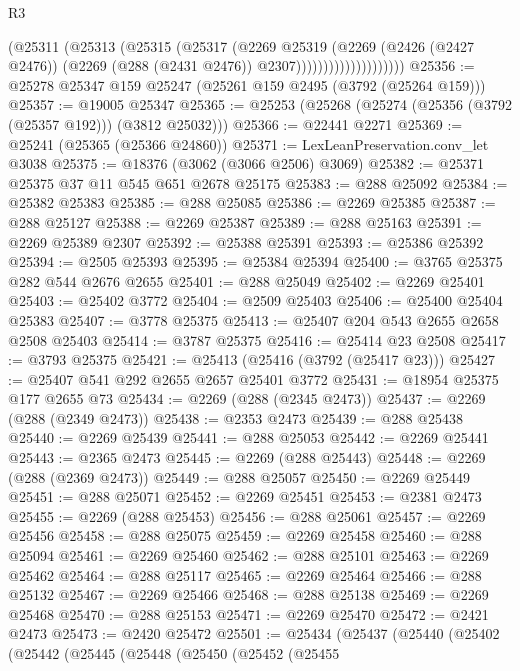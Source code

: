 \begin{lexlean}{R3}
\begin{coremodule}
                              (@25311
                                (@25313
                                  (@25315
                                    (@25317
                                      (@2269
                                        @25319
                                        (@2269
                                          (@2426 (@2427 @2476))
                                          (@2269 (@288 (@2431 @2476)) @2307))))))))))))))))))))
@25356 := @25278 @25347 @159 @25247 (@25261 @159 @2495 (@3792 (@25264 @159)))
@25357 := @19005 @25347
@25365 := @25253 (@25268 (@25274 (@25356 (@3792 (@25357 @192))) (@3812 @25032)))
@25366 := @22441 @2271
@25369 := @25241 (@25365 (@25366 @24860))
@25371 := LexLeanPreservation.conv_let @3038
@25375 := @18376 (@3062 (@3066 @2506) @3069)
@25382 := @25371 @25375 @37 @11 @545 @651 @2678 @25175
@25383 := @288 @25092
@25384 := @25382 @25383
@25385 := @288 @25085
@25386 := @2269 @25385
@25387 := @288 @25127
@25388 := @2269 @25387
@25389 := @288 @25163
@25391 := @2269 @25389 @2307
@25392 := @25388 @25391
@25393 := @25386 @25392
@25394 := @2505 @25393
@25395 := @25384 @25394
@25400 := @3765 @25375 @282 @544 @2676 @2655
@25401 := @288 @25049
@25402 := @2269 @25401
@25403 := @25402 @3772
@25404 := @2509 @25403
@25406 := @25400 @25404 @25383
@25407 := @3778 @25375
@25413 := @25407 @204 @543 @2655 @2658 @2508 @25403
@25414 := @3787 @25375
@25416 := @25414 @23 @2508
@25417 := @3793 @25375
@25421 := @25413 (@25416 (@3792 (@25417 @23)))
@25427 := @25407 @541 @292 @2655 @2657 @25401 @3772
@25431 := @18954 @25375 @177 @2655 @73
@25434 := @2269 (@288 (@2345 @2473))
@25437 := @2269 (@288 (@2349 @2473))
@25438 := @2353 @2473
@25439 := @288 @25438
@25440 := @2269 @25439
@25441 := @288 @25053
@25442 := @2269 @25441
@25443 := @2365 @2473
@25445 := @2269 (@288 @25443)
@25448 := @2269 (@288 (@2369 @2473))
@25449 := @288 @25057
@25450 := @2269 @25449
@25451 := @288 @25071
@25452 := @2269 @25451
@25453 := @2381 @2473
@25455 := @2269 (@288 @25453)
@25456 := @288 @25061
@25457 := @2269 @25456
@25458 := @288 @25075
@25459 := @2269 @25458
@25460 := @288 @25094
@25461 := @2269 @25460
@25462 := @288 @25101
@25463 := @2269 @25462
@25464 := @288 @25117
@25465 := @2269 @25464
@25466 := @288 @25132
@25467 := @2269 @25466
@25468 := @288 @25138
@25469 := @2269 @25468
@25470 := @288 @25153
@25471 := @2269 @25470
@25472 := @2421 @2473
@25473 := @2420 @25472
@25501 := @25434
    (@25437
      (@25440
        (@25402
          (@25442
            (@25445
              (@25448
                (@25450
                  (@25452
                    (@25455

\end{coremodule}
\end{lexlean}
